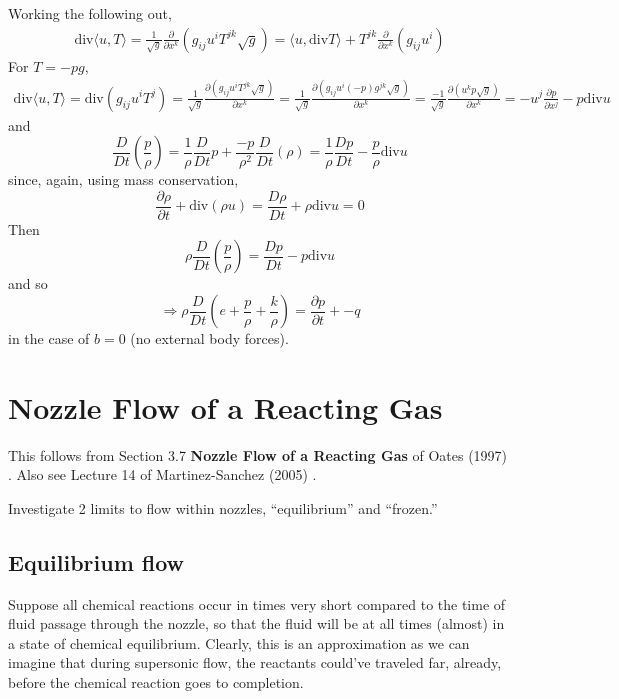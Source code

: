 \documentclass[10pt]{amsart}
\begin{document}
\begin{multicols*}{2}
\[\]
Working the following out,
\[
\begin{gathered}
  \text{div}\langle u, T \rangle = \frac{1}{\sqrt{g}} \frac{ \partial }{ \partial x^k} (g_{ij} u^i T^{jk} \sqrt{g} ) = \langle u, \text{div}T \rangle + T^{jk} \frac{ \partial }{ \partial x^k}(g_{ij} u^i )
\end{gathered}
\]
For $T = -p g$, 
\[
\begin{gathered}
  \text{div}\langle u, T \rangle  = \text{div}( g_{ij}u^i T^j ) = \frac{1}{\sqrt{g}} \frac{ \partial ( g_{ij} u^i T^{jk} \sqrt{g} ) }{ \partial x^k } = \frac{1}{\sqrt{g}} \frac{ \partial ( g_{ij} u^i (-p)g^{jk } \sqrt{g} ) }{ \partial x^k} = \frac{-1}{\sqrt{g}} \frac{ \partial ( u^k p \sqrt{g} ) }{ \partial x^k} = -u^j \frac{ \partial p }{ \partial x^j} - p \text{div}u
\end{gathered}
\]
and
\[
\frac{D}{Dt}\left( \frac{ p}{\rho} \right) = \frac{1}{\rho} \frac{D}{Dt}p + \frac{-p}{\rho^2} \frac{D}{Dt}(\rho) = \frac{1}{\rho} \frac{Dp}{Dt} - \frac{p}{\rho} \text{div}u
\]
since, again, using mass conservation, 
\[
\frac{ \partial \rho }{ \partial t} + \text{div}(\rho u) = \frac{D\rho }{ Dt} + \rho \text{div}u = 0 
\]
Then
\[
\rho \frac{D}{Dt} \left( \frac{ p}{ \rho } \right) = \frac{Dp}{Dt} - p \text{div}u
\]
and so
\[
\Longrightarrow \rho \frac{D}{Dt} \left( e + \frac{p}{\rho} + \frac{k}{\rho} \right) = \frac{ \partial p}{ \partial t} + -q
\]
in the case of $b=0$ (no external body forces).

\section{Nozzle Flow of a Reacting Gas}

This follows from Section 3.7 \textbf{Nozzle Flow of a Reacting Gas} of Oates (1997) \cite{GOates1997}.  Also see Lecture 14 of Martinez-Sanchez (2005) \cite{MMartinez-Sanchez2005}.  

Investigate 2 limits to flow within nozzles, ``equilibrium'' and ``frozen.'' 

\subsection{Equilibrium flow}

Suppose all chemical reactions occur in times very short compared to the time of fluid passage through the nozzle, so that the fluid will be at all times (almost) in a state of chemical equilibrium.  Clearly, this is an approximation as we can imagine that during supersonic flow, the reactants could've traveled far, already, before the chemical reaction goes to completion.  


\end{multicols*}
\end{document}
